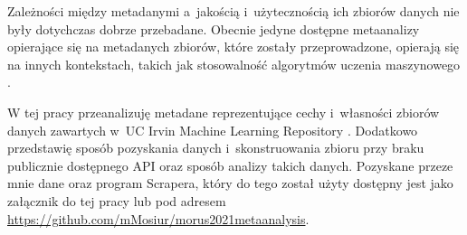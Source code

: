 Zależności między metadanymi a~jakością i~użytecznością ich zbiorów danych nie były dotychczas dobrze przebadane.
Obecnie jedyne dostępne metaanalizy opierające się na metadanych zbiorów, które zostały przeprowadzone, opierają się na innych kontekstach, takich jak stosowalność algorytmów uczenia maszynowego \cite{brazdil1994characterizing}.

W tej pracy przeanalizuję metadane reprezentujące cechy i~własności zbiorów danych zawartych w~UC Irvin Machine Learning Repository \cite{Dua:2021}.
Dodatkowo przedstawię sposób pozyskania danych i~skonstruowania zbioru przy braku publicznie dostępnego API oraz sposób analizy takich danych.
Pozyskane przeze mnie dane oraz program Scrapera, który do tego został użyty dostępny jest jako załącznik do tej pracy lub pod adresem \url{https://github.com/mMosiur/morus2021metaanalysis}.

